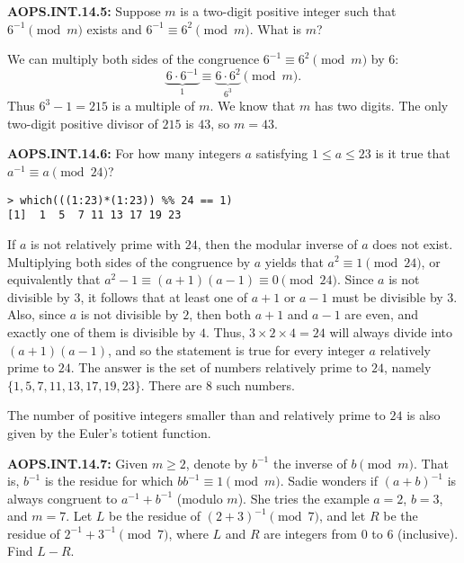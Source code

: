\documentclass[11pt]{article}
\newenvironment{uzdevums}[1][\unskip]{%
\vspace{3mm}
\noindent
\textbf{#1:}
\noindent}
{}
\begin{document}
\begin{uzdevums}[AOPS.INT.14.5]
Suppose $m$ is a two-digit positive integer such that $6^{-1}\pmod m$ exists and $6^{-1}\equiv 6^2\pmod m$. What is $m$?
\end{uzdevums}

We can multiply both sides of the congruence $6^{-1}\equiv 6^2\pmod m$ by $6$: $$
\underbrace{6\cdot 6^{-1}}_1 \equiv \underbrace{6\cdot 6^2}_{6^3} \pmod m.
$$Thus $6^3-1=215$ is a multiple of $m$. We know that $m$ has two digits. The only two-digit positive divisor of $215$ is $43$, so $m=\boxed{43}$.




\begin{uzdevums}[AOPS.INT.14.6]
For how many integers $a$ satisfying $1 \le a \le 23$ is it true that $a^{-1} \equiv a \pmod{24}$?
\end{uzdevums}

\begin{verbatim}
> which(((1:23)*(1:23)) %% 24 == 1)
[1]  1  5  7 11 13 17 19 23
\end{verbatim}

If $a$ is not relatively prime with $24$, then the modular inverse of $a$ does not exist. Multiplying both sides of the congruence by $a$ yields that $a^2 \equiv 1 \pmod{24}$, or equivalently that $a^2 - 1 \equiv (a+1)(a-1) \equiv 0 \pmod{24}$. Since $a$ is not divisible by $3$, it follows that at least one of $a+1$ or $a-1$ must be divisible by $3$. Also, since $a$ is not divisible by $2$, then both $a+1$ and $a-1$ are even, and exactly one of them is divisible by $4$. Thus, $3 \times 2 \times 4 = 24$ will always divide into $(a+1)(a-1)$, and so the statement is true for every integer $a$ relatively prime to $24$. The answer is the set of numbers relatively prime to $24$, namely $\{1,5,7,11,13,17,19,23\}$. There are $\boxed{8}$ such numbers.

The number of positive integers smaller than and relatively prime to $24$ is also given by the Euler's totient function.


\begin{uzdevums}[AOPS.INT.14.7]
Given $m\geq 2$, denote by $b^{-1}$ the inverse of $b\pmod{m}$. That is, $b^{-1}$ is the residue for which $bb^{-1}\equiv 1\pmod{m}$. Sadie wonders if $(a+b)^{-1}$ is always congruent to $a^{-1}+b^{-1}$ (modulo $m$). She tries the example $a=2$, $b=3$, and $m=7$. Let $L$ be the residue of $(2+3)^{-1}\pmod{7}$, and let $R$ be the residue of $2^{-1}+3^{-1}\pmod{7}$, where $L$ and $R$ are integers from $0$ to $6$ (inclusive). Find $L-R$.
\end{uzdevums}
\end{document}
